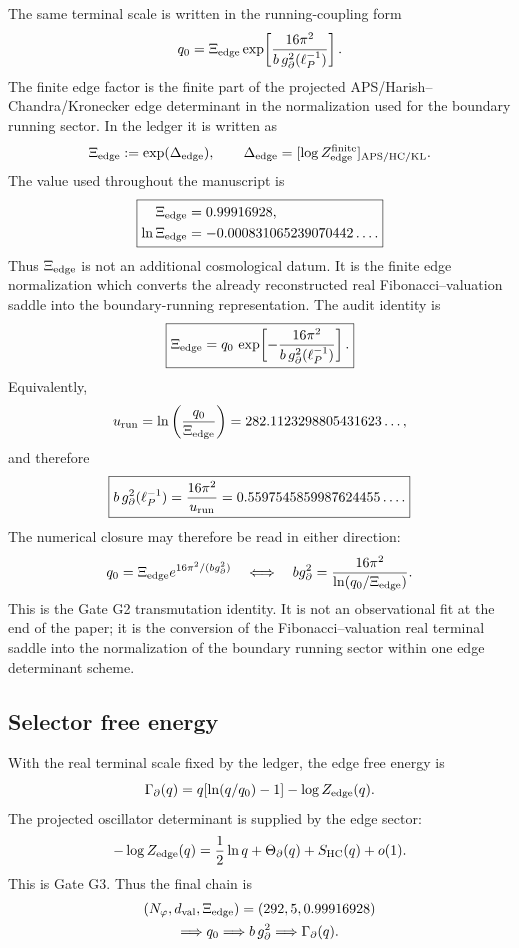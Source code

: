 \documentclass[aps,prd,reprint,nofootinbib,superscriptaddress,floatfix]{revtex4-2}
\numberwithin{equation}{section}
\theoremstyle{definition}
\theoremstyle{plain}
\begin{document}
The same terminal scale is written in the running-coupling form
\[
q_0
=
\Xi_{\rm edge}
\exp\!\left[
\frac{16\pi^2}{b\,g_\partial^2(\ell_P^{-1})}
\right].
\]
The finite edge factor is the finite part of the projected
APS/Harish--Chandra/Kronecker edge determinant in the normalization used for
the boundary running sector.  In the ledger it is written as
\[
\Xi_{\rm edge}:=\exp(\Delta_{\rm edge}),
\qquad
\Delta_{\rm edge}
=
[\log Z_{\rm edge}^{\rm finite}]_{\rm APS/HC/KL}.
\]
The value used throughout the manuscript is
\[
\boxed{
\begin{aligned}
\Xi_{\rm edge}&=0.99916928,\\
\ln\Xi_{\rm edge}
&=-0.000831065239070442\ldots .
\end{aligned}
}
\]
Thus \(\Xi_{\rm edge}\) is not an additional cosmological datum.  It is the
finite edge normalization which converts the already reconstructed real Fibonacci--valuation saddle into the boundary-running representation.  The
audit identity is
\[
\boxed{
\Xi_{\rm edge}
=
q_0\,
\exp\!\left[
-\frac{16\pi^2}{b\,g_\partial^2(\ell_P^{-1})}
\right].
}
\]
Equivalently,
\[
u_{\rm run}
=
\ln\left(\frac{q_0}{\Xi_{\rm edge}}\right)
=
282.1123298805431623\ldots,
\]
and therefore
\[
\boxed{
b\,g_\partial^2(\ell_P^{-1})
=
\frac{16\pi^2}{u_{\rm run}}
=
0.5597545859987624455\ldots .
}
\]
The numerical closure may therefore be read in either direction:
\[
q_0
=
\Xi_{\rm edge}e^{16\pi^2/(b g_\partial^2)}
\quad\Longleftrightarrow\quad
b g_\partial^2
=
\frac{16\pi^2}{\ln(q_0/\Xi_{\rm edge})}.
\]
This is the Gate G2 transmutation identity.  It is not an observational
fit at the end of the paper; it is the conversion of the
Fibonacci--valuation real terminal saddle into the normalization of the boundary
running sector within one edge determinant scheme.

\subsection{Selector free energy}

With the real terminal scale fixed by the ledger, the edge free energy is
\[
\Gamma_\partial(q)
=
q[\ln(q/q_0)-1]
-
\log Z_{\rm edge}(q).
\]
The projected oscillator determinant is supplied by the edge sector:
\[
-\log Z_{\rm edge}(q)
=
\frac12\ln q+\Theta_\partial(q)+S_{\rm HC}(q)+o(1).
\]
This is Gate G3.  Thus the final chain is
\[
\begin{gathered}
(N_\varphi,d_{\rm val},\Xi_{\rm edge})
=(292,5,0.99916928)\\
\Longrightarrow q_0
\Longrightarrow b\,g_\partial^2
\Longrightarrow \Gamma_\partial(q).
\end{gathered}
\]
\end{document}
